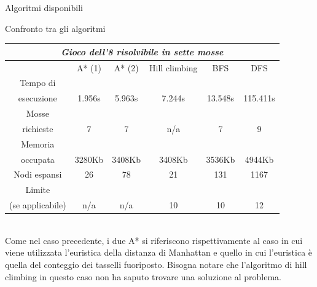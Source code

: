 \begin{chapter}{Algoritmi disponibili}
\begin{section}{Confronto tra gli algoritmi}
\begin{center}
    \label{tbl:confronto-algoritmi-2}
    \begin{tabular}{| c | c | c | c | c | c |}
    \hline
    \multicolumn{6}{|c|}{\textit{Gioco dell'8 risolvibile in sette mosse}} \\
    \hline
                     & A* (1) & A* (2) & Hill climbing & BFS     & DFS      \\\hline
    Tempo di         &        &        &               &         &          \\
    esecuzione       & 1.956s & 5.963s & 7.244s        & 13.548s & 115.411s \\\hline
    Mosse            &        &        &               &         &          \\
    richieste        & 7      & 7      & n/a           & 7       & 9        \\\hline
    Memoria          &        &        &               &         &          \\
    occupata         & 3280Kb & 3408Kb & 3408Kb        & 3536Kb  & 4944Kb   \\\hline
    Nodi espansi     & 26     & 78     & 21            & 131     & 1167     \\\hline
    Limite           &        &        &               &         &          \\
    (se applicabile) & n/a    & n/a    & 10            & 10      & 12       \\\hline
    \end{tabular}
\end{center}

\noindent \\ Come nel caso precedente, i due A* si riferiscono rispettivamente al
caso in cui viene utilizzata l'euristica della distanza di Manhattan e quello in
cui l'euristica \`e quella del conteggio dei tasselli fuoriposto. Bisogna notare
che l'algoritmo di hill climbing in questo caso non ha saputo trovare una soluzione
al problema.

\end{section}

\end{chapter}
